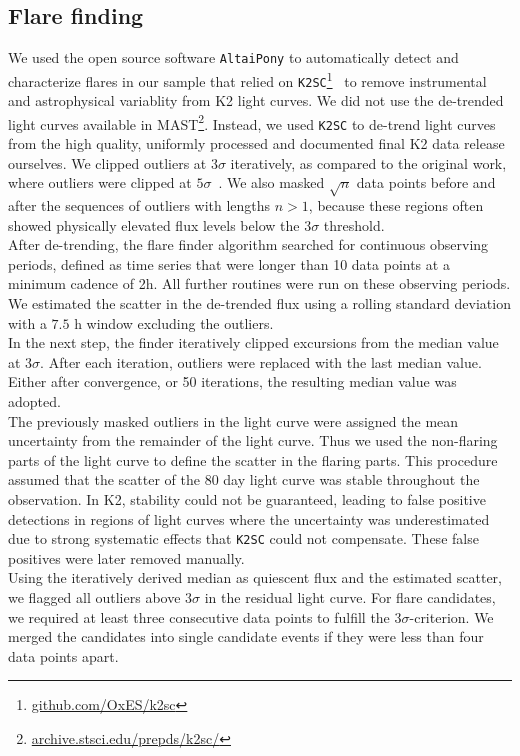 \documentclass{aa}
\begin{document}
\subsection{Flare finding}
\label{sec:sec:flarefinding}
We used the open source software \texttt{AltaiPony} to automatically detect and characterize flares in our sample that relied on \texttt{K2SC}\footnote{\url{github.com/OxES/k2sc}}~\citep{aigrain_k2sc_2016} to remove instrumental and astrophysical variablity from K2 light curves. We did not use the de-trended light curves available in MAST\footnote{\url{archive.stsci.edu/prepds/k2sc/}}. Instead, we used \texttt{K2SC} to de-trend light curves from the high quality, uniformly processed and documented final K2 data release ourselves. We clipped outliers at $3\sigma$ iteratively, as compared to the original work, where outliers were clipped at $5\sigma$~\citep{aigrain_k2sc_2016}. We also masked $\sqrt{n}$ data points before and after the sequences of outliers with lengths $n>1$, because these regions often showed physically elevated flux levels below the $3\sigma$ threshold.
\\
After de-trending, the flare finder algorithm searched for continuous observing periods, defined as time series that were longer than 10 data points at a minimum cadence of 2\;h. All further routines were run on these observing periods. We estimated the scatter in the de-trended flux using a rolling standard deviation with a $7.5$ h window excluding the outliers. 
\\
In the next step, the finder iteratively clipped excursions from the median value at $3\sigma$. After each iteration, outliers were replaced with the last median value. Either after convergence, or 50 iterations, the resulting median value was adopted. 
\\
The previously masked outliers in the light curve were assigned the mean uncertainty from the remainder of the light curve. Thus we used the non-flaring parts of the light curve to define the scatter in the flaring parts. This procedure assumed that the scatter of the 80 day light curve was stable throughout the observation. In K2, stability could not be guaranteed, leading to false positive detections in regions of light curves where the uncertainty was underestimated due to strong systematic effects that \texttt{K2SC} could not compensate. These false positives were later removed manually. 
\\
Using the iteratively derived median as quiescent flux and the estimated scatter, we flagged all outliers above $3\sigma$ in the residual light curve. For flare candidates, we required at least three consecutive data points to fulfill the $3\sigma$-criterion. We merged the candidates into single candidate events if they were less than four data points apart. 
\end{document}
